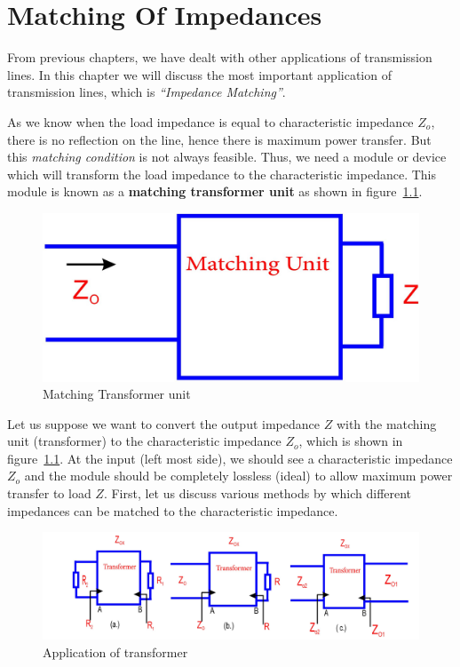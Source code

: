 \chapter{Matching Of Impedances}\label{lec:lec12}
From previous chapters, we have dealt with other applications of transmission lines. In this chapter we will discuss the most important application of transmission lines, which is \emph{\textquotedblleft Impedance Matching\textquotedblright}.

As we know when the load impedance is equal to characteristic impedance $Z_o$, there is no reflection on the line, hence there is maximum power transfer. But this \textit{matching condition} is not always feasible. Thus, we need a module or device which will transform the load impedance to the characteristic impedance. This module is known as a \textbf{matching transformer unit} as shown in figure~\ref{fig:fig7}.
\begin{figure}[h]
\centering
\includegraphics[width=0.7\linewidth]{./graphics/fig7}
\caption{Matching Transformer unit}
\label{fig:fig7}
\end{figure} 

Let us suppose we want to convert the output impedance $Z$ with the matching unit (transformer) to the characteristic impedance $Z_o$, which is shown in figure~\ref{fig:fig7}. At the input (left most side), we should see a characteristic impedance $ Z_o$ and the module should be completely lossless (ideal) to allow maximum power transfer to load $Z$. First, let us discuss various methods by which different impedances can be matched to the characteristic impedance.
\begin{figure}[h]
\centering
\includegraphics[width=1\linewidth]{./graphics/fig8}
\caption{Application of transformer}
\label{fig:fig8}
\end{figure}

